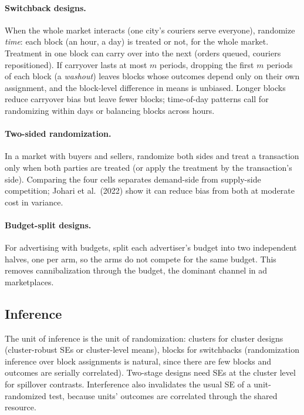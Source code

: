 \documentclass[11pt]{article}
\begin{document}
\paragraph{Switchback designs.} When the whole market interacts (one city's couriers serve everyone), randomize
\emph{time}: each block (an hour, a day) is treated or not, for the whole market. Treatment in one block can carry over
into the next (orders queued, couriers repositioned). If carryover lasts at most $m$ periods, dropping the first $m$
periods of each block (a \emph{washout}) leaves blocks whose outcomes depend only on their own assignment, and the
block-level difference in means is unbiased. Longer blocks reduce carryover bias but leave fewer blocks; time-of-day
patterns call for randomizing within days or balancing blocks across hours.

\paragraph{Two-sided randomization.} In a market with buyers and sellers, randomize both sides and treat a transaction
only when both parties are treated (or apply the treatment by the transaction's side). Comparing the four cells
separates demand-side from supply-side competition; Johari et al.\ (2022) show it can reduce bias from both at
moderate cost in variance.

\paragraph{Budget-split designs.} For advertising with budgets, split each advertiser's budget into two independent
halves, one per arm, so the arms do not compete for the same budget. This removes cannibalization through the
budget, the dominant channel in ad marketplaces.

\subsection{Inference}

The unit of inference is the unit of randomization: clusters for cluster designs (cluster-robust SEs or cluster-level
means), blocks for switchbacks (randomization inference over block assignments is natural, since there are few blocks
and outcomes are serially correlated). Two-stage designs need SEs at the cluster level for spillover contrasts.
Interference also invalidates the usual SE of a unit-randomized test, because units' outcomes are correlated through
the shared resource.
\end{document}
